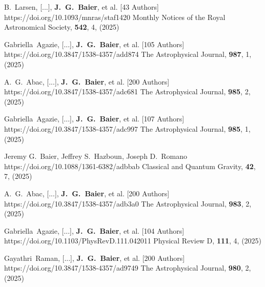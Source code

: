          {B.~{Larsen}, [...], \textbf{J.~G.~{Baier}}, et al. [43 Authors]}
         {https://doi.org/10.1093/mnras/staf1420}
         {{Monthly Notices of the Royal Astronomical Society}, \textbf{542}, 4, (2025)}

         {Gabriella~{Agazie}, [...], \textbf{J.~G.~{Baier}}, et al. [105 Authors]}
         {https://doi.org/10.3847/1538-4357/add874}
         {{The Astrophysical Journal}, \textbf{987}, 1, (2025)}

         {A.~G.~{Abac}, [...], \textbf{J.~G.~{Baier}}, et al. [200 Authors]}
         {https://doi.org/10.3847/1538-4357/adc681}
         {{The Astrophysical Journal}, \textbf{985}, 2, (2025)}

         {Gabriella~{Agazie}, [...], \textbf{J.~G.~{Baier}}, et al. [107 Authors]}
         {https://doi.org/10.3847/1538-4357/adc997}
         {{The Astrophysical Journal}, \textbf{985}, 1, (2025)}

         {Jeremy G.~{Baier}, Jeffrey S.~{Hazboun}, Joseph D.~{Romano}}
         {https://doi.org/10.1088/1361-6382/adbbab}
         {{Classical and Quantum Gravity}, \textbf{42}, 7, (2025)}

         {A.~G.~{Abac}, [...], \textbf{J.~G.~{Baier}}, et al. [200 Authors]}
         {https://doi.org/10.3847/1538-4357/adb3a0}
         {{The Astrophysical Journal}, \textbf{983}, 2, (2025)}

         {Gabriella~{Agazie}, [...], \textbf{J.~G.~{Baier}}, et al. [104 Authors]}
         {https://doi.org/10.1103/PhysRevD.111.042011}
         {{Physical Review D}, \textbf{111}, 4, (2025)}

         {Gayathri~{Raman}, [...], \textbf{J.~G.~{Baier}}, et al. [200 Authors]}
         {https://doi.org/10.3847/1538-4357/ad9749}
         {{The Astrophysical Journal}, \textbf{980}, 2, (2025)}

